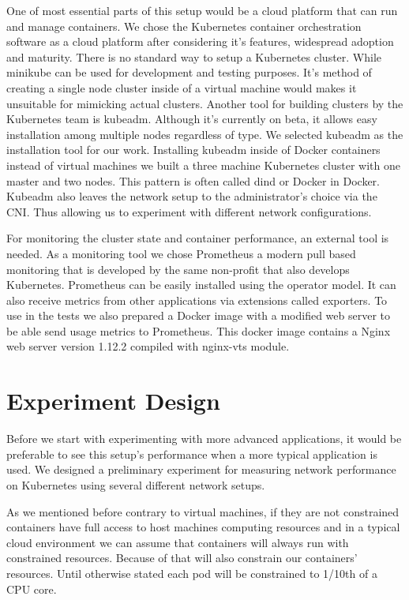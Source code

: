 \documentclass[12pt,oneandhalf,chaparabic,ceng,ms,eng,oneside,pntc]{gsufbe}
\begin{document}
One of most essential parts of this setup would be a cloud platform that can run and manage containers.
We chose the Kubernetes container orchestration software as a cloud platform after considering it's
features, widespread adoption and maturity. There is no standard way to setup a Kubernetes cluster.
While minikube can be used for development and testing purposes. It's method of creating a single node
cluster inside of a virtual machine would makes it unsuitable for mimicking actual clusters. Another
tool for building clusters by the Kubernetes team is kubeadm. Although it's currently on beta, it
allows easy installation among multiple nodes regardless of type. We selected kubeadm as the 
installation tool for our work. Installing kubeadm inside of Docker containers instead of virtual
machines we built a three machine Kubernetes cluster with one master and two nodes. This pattern is
often called dind or Docker in Docker. Kubeadm also leaves the network setup to the administrator's
choice via the CNI. Thus allowing us to experiment with different network configurations.

For monitoring the cluster state and container performance, an external tool is needed. As a monitoring
tool we chose Prometheus a modern pull based monitoring that is developed by the same non-profit that
also develops Kubernetes. Prometheus can be easily installed using the operator model. It can also
receive metrics from other applications via extensions called exporters. To use in the tests we also 
prepared a Docker image with a modified web server to be able send usage metrics to Prometheus. This
docker image contains a Nginx web server version 1.12.2 compiled with nginx-vts module.

\section{Experiment Design}
Before we start with experimenting with more advanced applications, it would be preferable to see this
setup's performance when a more typical application is used. We designed a preliminary experiment for
measuring network performance on Kubernetes using several different network setups.

As we mentioned before contrary to virtual machines, if they are not constrained containers have full
access to host machines computing resources and in a typical cloud environment we can assume that
containers will always run with constrained resources. Because of that will also constrain our
containers' resources. Until otherwise stated each pod will be constrained to 1/10th of a CPU core.
\end{document}
